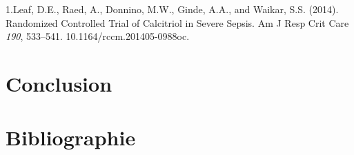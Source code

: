\documentclass[
  a4paper,
  DIV=11,
  numbers=noendperiod,
  listof=totoc]{scrreprt}
\begin{document}
1.Leaf, D.E., Raed, A., Donnino, M.W., Ginde, A.A., and Waikar, S.S.
(2014). Randomized Controlled Trial of Calcitriol in Severe Sepsis. Am J
Resp Crit Care \emph{190}, 533--541. 10.1164/rccm.201405-0988oc.

\newpage{}

\hypertarget{conclusion}{%
\chapter{Conclusion}\label{conclusion}}

\newpage{}

\hypertarget{bibliographie}{%
\chapter{Bibliographie}\label{bibliographie}}

\printbibliography[heading=none]
\end{document}
